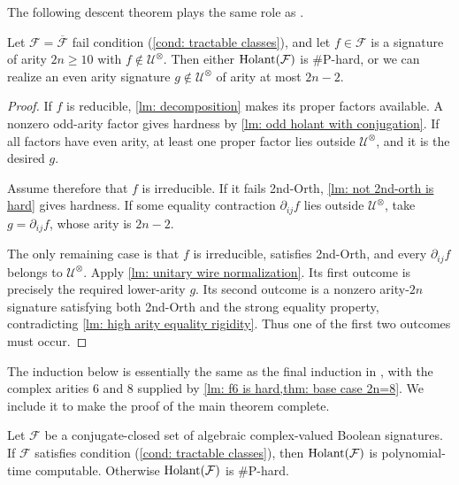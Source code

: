 The following descent theorem plays the same role as
\cite[Lemma~9.1]{realholant}. 

\begin{theorem}
\label{thm: strict arity descent}
Let $\mathcal F=\overline{\mathcal F}$ fail condition
\rm{(\ref{cond: tractable classes})}, and let $f\in \mathcal{F}$ is a
signature of arity $2n\geq10$ with
$f\notin\mathcal U^{\otimes}$.  Then either
$\operatorname{Holant}(\mathcal F)$ is \#P-hard, or we can realize an even arity signature
$g\notin\mathcal U^{\otimes}$ of arity at most $2n-2$.
\end{theorem}

\begin{proof}
If $f$ is reducible, \cref{lm: decomposition} makes its proper factors
available.  A nonzero odd-arity factor gives hardness by
\cref{lm: odd holant with conjugation}.  If all factors have even arity,
at least one proper factor lies outside $\mathcal U^{\otimes}$, and it is
the desired $g$.

Assume therefore that $f$ is irreducible.  If it fails {\sc 2nd-Orth},
\cref{lm: not 2nd-orth is hard} gives hardness.  If some equality
contraction $\partial_{ij}f$ lies outside
$\mathcal U^{\otimes}$, take $g=\partial_{ij}f$, whose arity is
$2n-2$.

The only remaining case is that $f$ is irreducible, satisfies
{\sc 2nd-Orth}, and every $\partial_{ij}f$ belongs to
$\mathcal U^{\otimes}$.  Apply
\cref{lm: unitary wire normalization}.  Its first outcome is precisely the
required lower-arity $g$.  Its second outcome is a nonzero arity-$2n$
signature satisfying both {\sc 2nd-Orth} and the strong equality property,
contradicting \cref{lm: high arity equality rigidity}.  Thus one of the
first two outcomes must occur.
\end{proof}

The induction below is essentially the same as the final induction in
\cite[Theorem~9.2]{realholant}, with the complex arities $6$ and $8$
supplied by \cref{lm: f6 is hard,thm: base case 2n=8}.  We include it to
make the proof of the main theorem complete.

\begin{theorem}
\label{thm: conjugate closed Holant dichotomy}
Let $\mathcal F$ be a conjugate-closed set of algebraic complex-valued Boolean
signatures.  
If $\mathcal F$ satisfies condition
\rm{(\ref{cond: tractable classes})}, then $\operatorname{Holant}(\mathcal F)$ is
polynomial-time computable.  Otherwise $\operatorname{Holant}(\mathcal F)$ is
\#P-hard.
\end{theorem}

